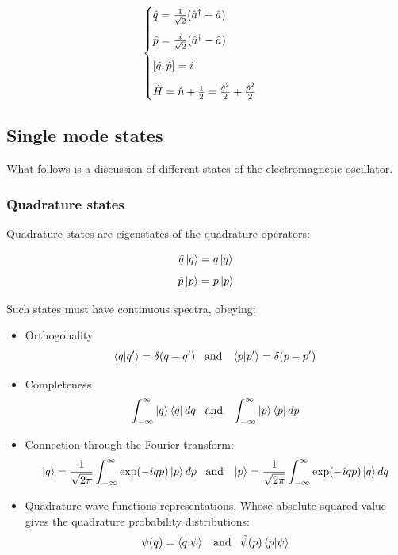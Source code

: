 \documentclass[12pt,a4paper]{report}
\begin{document}
\begin{equation}
    \begin{cases}
        \hat q = \frac{1}{\sqrt{2}}(\hat a^{\dag}+\hat a)\\[0.3cm]
        \hat p = \frac{i}{\sqrt{2}}(\hat a^{\dag}-\hat a)\\[0.3cm]
        \comm{\hat q}{\hat p}=i\\[0.3cm]
        \hat H=\hat n +\frac{1}{2}=\frac{\hat q^2}{2}+\frac{\hat p^2}{2}
    \end{cases}
\end{equation}

\subsection{Single mode states}

What follows is a discussion of different states of the electromagnetic oscillator.

\subsubsection{Quadrature states}

Quadrature states are eigenstates of the quadrature operators:

\begin{equation}
    \hat q \ket{q}=q\ket{q}
\end{equation}
\begin{equation}
    \hat p \ket{p}=p\ket{p}
\end{equation}

Such states must have continuous spectra, obeying:

\begin{itemize}
    \item Orthogonality
    \begin{equation*}
        \braket{q}{q'}=\delta(q-q')\;\;\;\text{and}\;\;\;\braket{p}{p'}=\delta(p-p')
    \end{equation*}
    \item Completeness
    \begin{equation*}
        \int_{-\infty}^{\infty}\ket{q}\bra{q}dq\;\;\;\text{and}\;\;\;\int_{-\infty}^{\infty}\ket{p}\bra{p}dp
    \end{equation*}
    \item Connection through the Fourier transform:
    \begin{equation*}
        \ket{q}=\frac{1}{\sqrt{2\pi}}\int_{-\infty}^{\infty}\exp(-iqp)\ket{p}dp\;\;\;\text{and}\;\;\;\ket{p}=\frac{1}{\sqrt{2\pi}}\int_{-\infty}^{\infty}\exp(-iqp)\ket{q}dq
    \end{equation*}
    \item Quadrature wave functions representations. Whose absolute squared value gives the quadrature probability distributions:
    \begin{equation*}
        \psi(q)=\braket{q}{\psi}\;\;\;\text{and}\;\;\;\Tilde{\psi}(p)\braket{p}{\psi}
    \end{equation*}
\end{itemize}
\end{document}
